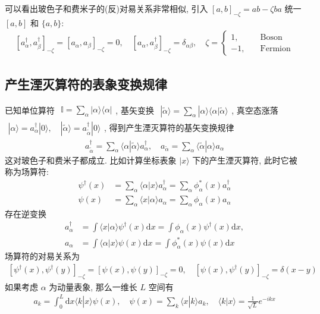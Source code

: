 \documentclass[../../main.tex]{subfiles}
\begin{document}
可以看出玻色子和费米子的(反)对易关系非常相似, 引入 $[a,b]_{-\zeta} = ab-\zeta ba$ 统一 $[a,b]$ 和 $\{a,b\}$:
\begin{align*}
  \left[a_{\alpha}^{\dagger},a_{\beta}^{\dagger}\right]_{-\zeta} = \left[a_{\alpha},a_{\beta}\right]_{-\zeta} = 0,\quad \left[a_{\alpha},a_{\beta}^{\dagger}\right]_{-\zeta} = \delta_{\alpha\beta},\quad\zeta = \left\{\begin{aligned}
    1,\quad &\text{Boson}\\
    -1,\quad &\text{Fermion}
  \end{aligned}\right.
\end{align*}
\subsection{产生湮灭算符的表象变换规律}

已知单位算符 $\begin{aligned}
  \mathbb{I} = \sum_{\alpha}|\alpha\rangle\langle\alpha|
\end{aligned}$, 基矢变换 $\begin{aligned}
  |\widetilde{\alpha}\rangle = \sum_{\alpha}|\alpha\rangle\langle\alpha|\widetilde{\alpha}\rangle
\end{aligned}$, 真空态涨落 $\begin{aligned}
  |\alpha\rangle = a_{\alpha}^{\dagger}|0\rangle,\quad|\widetilde{\alpha}\rangle = a_{\widetilde{\alpha}}^{\dagger}|0\rangle
\end{aligned}$, 得到产生湮灭算符的基矢变换规律
\begin{align*}
  a_{\widetilde{\alpha}}^{\dagger} = \sum_{\alpha}\langle\alpha|\widetilde{\alpha}\rangle a_{\alpha}^{\dagger},\quad a_{\widetilde{\alpha}} = \sum_{\alpha}\langle \widetilde{\alpha}|\alpha\rangle a_{\alpha}
\end{align*}
这对玻色子和费米子都成立. 比如计算坐标表象 $|x\rangle$ 下的产生湮灭算符, 此时它被称为场算符:
\begin{align*}
  \psi^{\dagger}(x) &= \sum_{\alpha}\langle\alpha | x\rangle a_{\alpha}^{\dagger} = \sum_{\alpha}\phi^{*}_{\alpha}(x)a_{\alpha}^{\dagger}\\
  \psi(x) &= \sum_{\alpha}\langle x|\alpha\rangle a_{\alpha} = \sum_{\alpha}\phi_{\alpha}(x)a_{\alpha}
\end{align*}
存在逆变换
\begin{align*}
  a_{\alpha}^{\dagger} &= \int\langle x|\alpha\rangle\psi^{\dagger}(x)\mathrm{d}x = \int\phi_{\alpha}(x)\psi^{\dagger}(x)\mathrm{d}x,\\
  a_{\alpha} &= \int \langle\alpha|x\rangle\psi(x)\mathrm{d}x = \int\phi^{*}_{\alpha}(x)\psi(x)\mathrm{d}x
\end{align*}
场算符的对易关系为
\begin{align*}
  \left[\psi^{\dagger}(x),\psi^{\dagger}(y)\right]_{-\zeta} = \left[\psi(x),\psi(y)\right]_{-\zeta} = 0,\quad \left[\psi(x),\psi^{\dagger}(y)\right]_{-\zeta} = \delta(x-y)
\end{align*}
如果考虑 $\alpha$ 为动量表象, 那么一维长 $L$ 空间有
\begin{align*}
  a_{k} = \int_{0}^{L}\mathrm{d}x\langle k|x\rangle\psi(x),\quad \psi(x) = \sum_{k}\langle x|k\rangle a_{k},\quad \langle k|x\rangle = \frac{1}{\sqrt{L}}e^{-ikx}
\end{align*}
\end{document}
